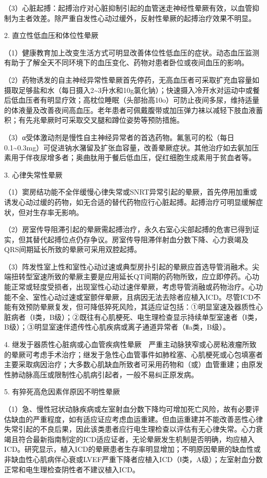 （3）心脏起搏：起搏治疗对心脏抑制引起的血管迷走神经性晕厥有效，以血管抑制为主者效差。除严重自发性心动过缓外，反射性晕厥的起搏治疗效果不明显。

2. 直立性低血压和体位性晕厥

（1）健康教育加上改变生活方式可明显改善体位性低血压的症状。动态血压监测有助于了解全天不同环境下的血压变化、药物对患者卧位或夜间血压的影响。

（2）药物诱发的自主神经异常性晕厥首先停药，无高血压者可采取扩充血容量如摄取足够盐和水（每日摄入2\textasciitilde{}3升水和10g氯化钠）；快速摄入冷开水对运动中或餐后低血压者有明显疗效；高枕位睡眠（头部抬高10o）可防止夜间多尿，维持适量的体液量及改善夜间高血压。老年患者可佩戴腹带或加压弹力袜以减轻下肢血液蓄积；有先兆晕厥时可采取交叉腿和蹲位姿势等预防措施。

（3）α受体激动剂是慢性自主神经异常者的首选药物。氟氢可的松（每日0.1\textasciitilde{}0.3mg）可促进钠水潴留及扩张血容量，改善晕厥症状。其他治疗如去氨加压素用于伴夜尿增多者；奥曲肽用于餐后低血压，促红细胞生成素用于贫血者等。

3. 心律失常性晕厥

（1）窦房结功能不全伴缓慢心律失常或SNRT异常引起的晕厥，首先停用加重或诱发心动过缓的药物，如无合适的替代药物应行心脏起搏。起搏治疗可明显缓解症状，但对生存率无影响。

（2）房室传导阻滞引起的晕厥需起搏治疗，永久右室心尖部起搏的危害已得到证实，但其替代起搏位点仍存争议。房室传导阻滞伴射血分数下降、心力衰竭及QRS间期延长所致的晕厥可采用双腔起搏。

（3）阵发性室上性和室性心动过速或典型房扑引起的晕厥应首选导管消融术。尖端扭转型室速所致的晕厥主要是应用延长QT间期的药物所致，应立即停药。心功能正常或轻度受损者，出现室性心动过速伴晕厥，考虑导管消融或药物治疗。心功能不全、室性心动过速或室颤伴晕厥，且病因无法去除者应植入ICD。尽管ICD不能有效预防晕厥复发，但可降低猝死风险，其适应证包括：①明显室速及器质性心脏病者（Ⅰ类，B级）；②既往有心肌梗死、电生理检查显示持续单型室速者（Ⅰ类，B级）；③明显室速伴遗传性心肌疾病或离子通道异常者（Ⅱa类，B级）。

4.
继发于器质性心脏病或心血管疾病性晕厥　严重主动脉狭窄或心房粘液瘤所致的晕厥可考虑手术治疗；继发于急性心血管事件如肺栓塞、心肌梗死或心包填塞者主要采取病因治疗；大多数心肌缺血所致者可采用药物和（或）血管重建；由原发性肺动脉高压或限制性心肌病引起者，一般不易纠正原发病。

5. 有猝死高危因素伴原因不明性晕厥

（1）急、慢性冠状动脉疾病或左室射血分数下降均可增加死亡风险，故有必要评估缺血的严重程度，如有适应证应考虑血运重建。但血运重建并不能改善恶性心律失常引起的不良后果，因此该类患者应行电生理检查以评估有无心律失常。心力衰竭且符合最新指南制定的ICD适应证者，无论晕厥发生机制是否明确，均应植入ICD。研究显示，植入ICD的晕厥患者生存率明显增加；不明原因晕厥的缺血性或非缺血性心肌病伴心衰或LVEF严重下降者应植入ICD（Ⅰ类，A级）；左室射血分数正常和电生理检查阴性者不建议植入ICD。

